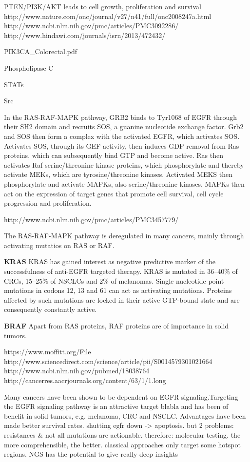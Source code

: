       PTEN/PI3K/AKT leads to cell growth, proliferation and survival
      http://www.nature.com/onc/journal/v27/n41/full/onc2008247a.html
      http://www.ncbi.nlm.nih.gov/pmc/articles/PMC3092286/
      http://www.hindawi.com/journals/isrn/2013/472432/

PIK3CA_Colorectal.pdf

      Phospholipase C

      STATs

      Src

      In the RAS-RAF-MAPK pathway, GRB2 binds to Tyr1068 of EGFR through their
      SH2 domain and recruits SOS, a guanine nucleotide exchange factor. Grb2
      and SOS then form a complex with the activated EGFR, which activates SOS.
      Activates SOS, through its GEF activity, then induces GDP removal from Ras
      proteins, which can subsequently bind GTP and become active. Ras then
      activates Raf serine/threonine kinase proteins, which phosphorylate and
      thereby activate MEKs, which are tyrosine/threonine kinases. Activated
      MEKS then phosphorylate and activate MAPKs, also serine/threonine kinases.
      MAPKs then act on the expression of target genes that promote cell survival,
      cell cycle progression and proliferation.

      http://www.ncbi.nlm.nih.gov/pmc/articles/PMC3457779/

      The RAS-RAF-MAPK pathway is deregulated in many cancers, mainly through
      activating mutatios on RAS or RAF.

      \textbf{KRAS}
      KRAS has gained interest as negative predictive
      marker of the successfulness of anti-EGFR targeted therapy. KRAS is
      mutated in 36--40\% of CRCs, 15--25\% of NSCLCs and 2\% of melanomas.
      Single nucleotide point mutations in codons 12, 13 and 61 can act as
      activating mutations. Proteins affected by such mutations are locked in
      their active GTP-bound state and are consequently constantly active.

      \textbf{BRAF}
      Apart from RAS proteins, RAF proteins are of importance in solid tumors.

      https://www.moffitt.org/File%
      http://www.sciencedirect.com/science/article/pii/S0014579301021664
      http://www.ncbi.nlm.nih.gov/pubmed/18038764
      http://cancerres.aacrjournals.org/content/63/1/1.long

      Many cancers have been shown to be dependent on EGFR signaling.Targeting
      the EGFR signaling pathway is an attractive target blabla and has been of
      benefit in solid tumors, e.g. melanoma, CRC and NSCLC. Advantages have
      been made better survival rates. shutting egfr down -> apoptosis. but 2
      problems: resistances & not all mutations are actionable. therefore:
      molecular testing. the more comprehensible, the better. classical
      approaches only target some hotspot regions. NGS has the potential to give
      really deep insights

